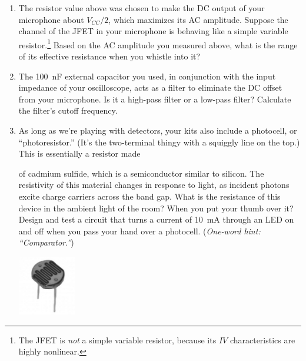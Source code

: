 \begin{enumerate}[wide]
\item The resistor value above was chosen to make the DC output of your microphone about $V_{CC}/2$, which maximizes its AC amplitude.  Suppose the channel of the JFET in your microphone is behaving like a simple variable resistor.\footnote{The JFET is \textit{not} a simple variable resistor, because its $IV$ characteristics are highly nonlinear.}  Based on the AC amplitude you measured above, what is the range of its effective resistance when you whistle into it?


\item The 100~nF external capacitor you used, in conjunction with the input impedance of your oscilloscope, acts as a filter to eliminate the DC offset from your microphone.  Is it a high-pass filter or a low-pass filter?  Calculate the filter's cutoff frequency.

\item As long as we're playing with detectors, your kits also include a photocell, or ``photoresistor.''  (It's the two-terminal thingy with a squiggly line on 
the top.) This is essentially a resistor made 
\begin{minipage}{0.8\textwidth}
\vspace{.18\baselineskip}
of cadmium sulfide, which is a semiconductor similar to silicon.  The resistivity of this material changes in response to light, 
as incident photons excite charge carriers across the band gap.  What is the resistance of this device in the ambient light of the room?  When you put your thumb over it?  Design and test a circuit that turns a current of 10~mA through an LED on and off  when you pass your hand over a photocell.  (\textit{One-word hint: ``Comparator.''})
\end{minipage}
\begin{minipage}{0.19\textwidth}
\begin{center}
\includegraphics[width=1in]{microphone_photocell/photocell_bw.eps}
\end{center}
\end{minipage}


\end{enumerate}
